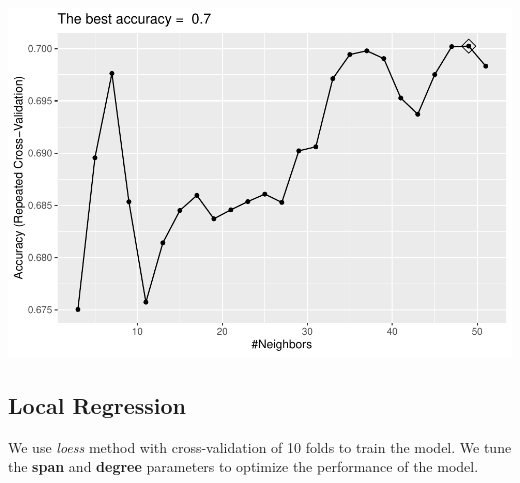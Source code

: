 \documentclass[]{article}
\newenvironment{Shaded}{\begin{snugshade}}{\end{snugshade}}
\newcommand{\CommentTok}[1]{\textcolor[rgb]{0.56,0.35,0.01}{\textit{#1}}}
\newcommand{\DataTypeTok}[1]{\textcolor[rgb]{0.13,0.29,0.53}{#1}}
\newcommand{\KeywordTok}[1]{\textcolor[rgb]{0.13,0.29,0.53}{\textbf{#1}}}
\newcommand{\NormalTok}[1]{#1}
\newcommand{\OperatorTok}[1]{\textcolor[rgb]{0.81,0.36,0.00}{\textbf{#1}}}
\newcommand{\StringTok}[1]{\textcolor[rgb]{0.31,0.60,0.02}{#1}}
\begin{document}
\includegraphics{LiverDisease_files/figure-latex/unnamed-chunk-26-1.pdf}

\begin{Shaded}
\end{Shaded}

\subsection{Local Regression}

We use \emph{loess} method with cross-validation of 10 folds to train
the model. We tune the \textbf{span} and \textbf{degree} parameters to
optimize the performance of the model.
\end{document}
